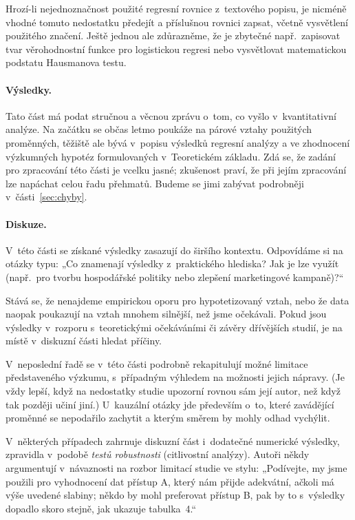 \documentclass[11pt,a4paper]{article}
\begin{document}
Hrozí-li nejednoznačnost použité regresní rovnice z~textového popisu, je nicméně vhodné tomuto nedostatku předejít a příslušnou rovnici zapsat, včetně vysvětlení použitého značení. Ještě jednou ale zdůrazněme, že je zbytečné např.\ zapisovat tvar věrohodnostní funkce pro logistickou regresi nebo vysvětlovat matematickou podstatu Hausmanova testu.

\paragraph{Výsledky.} Tato část má podat stručnou a věcnou zprávu o~tom, co vyšlo v~kvantitativní analýze. Na začátku se občas letmo poukáže na párové vztahy použitých proměnných, těžiště ale bývá v~popisu výsledků regresní analýzy a ve zhodnocení výzkumných hypotéz formulovaných v~Teoretickém základu. Zdá se, že zadání pro zpracování této části je vcelku jasné; zkušenost praví, že při jejím zpracování lze napáchat celou řadu přehmatů. Budeme se jimi zabývat podrobněji v~části~\ref{sec:chyby}.

\paragraph{Diskuze.} V~této části se získané výsledky zasazují do širšího kontextu. Odpovídáme si na otázky typu: „Co znamenají výsledky z~praktického hlediska? Jak je lze využít (např.\ pro tvorbu hospodářské politiky nebo zlepšení marketingové kampaně)?“

Stává se, že nenajdeme empirickou oporu pro hypotetizovaný vztah, nebo že data naopak poukazují na vztah mnohem silnější, než jsme očekávali. Pokud jsou výsledky v~rozporu s~teoretickými očekáváními či závěry dřívějších studií, je na místě v~diskuzní části hledat příčiny.

V~neposlední řadě se v~této části podrobně rekapitulují možné limitace představeného výzkumu, s~případným výhledem na možnosti jejich nápravy. (Je vždy lepší, když na nedostatky studie upozorní rovnou sám její autor, než když tak později učiní jiní.) U~kauzální otázky jde především o~to, které zavádějící proměnné se nepodařilo zachytit a kterým směrem by mohly odhad vychýlit.

V~některých případech zahrnuje diskuzní část i~dodatečné numerické výsledky, zpravidla v~podobě \emph{testů robustnosti} (citlivostní analýzy). Autoři někdy argumentují v~návaznosti na rozbor limitací studie ve stylu: „Podívejte, my jsme použili pro vyhodnocení dat přístup A, který nám přijde adekvátní, ačkoli má výše uvedené slabiny; někdo by mohl preferovat přístup B, pak by to s~výsledky dopadlo skoro stejně, jak ukazuje tabulka~4.“
\end{document}
